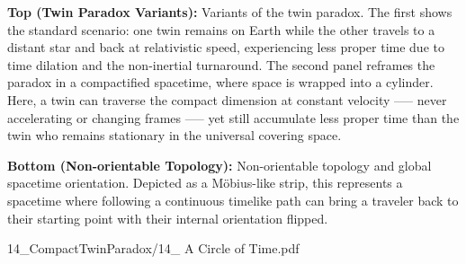 \begin{SideNotePage}{
  \textbf{Top (Twin Paradox Variants):} Variants of the twin paradox. The first shows the standard scenario: one twin remains on Earth while the other travels to a distant star and back at relativistic speed, experiencing less proper time due to time dilation and the non-inertial turnaround. The second panel reframes the paradox in a compactified spacetime, where space is wrapped into a cylinder. Here, a twin can traverse the compact dimension at constant velocity —-- never accelerating or changing frames —-- yet still accumulate less proper time than the twin who remains stationary in the universal covering space. \par
  \textbf{Bottom (Non-orientable Topology):} Non-orientable topology and global spacetime orientation. Depicted as a Möbius-like strip, this represents a spacetime where following a continuous timelike path can bring a traveler back to their starting point with their internal orientation flipped.
}{14_CompactTwinParadox/14_ A Circle of Time.pdf}
\end{SideNotePage}
